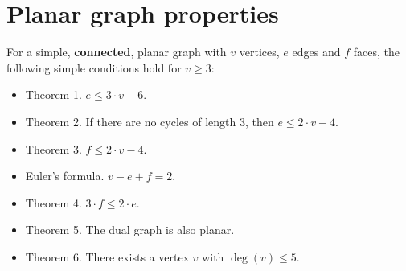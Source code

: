 \section*{Planar graph properties}

For a simple, \textbf{connected}, planar graph with $v$ vertices, $e$ edges and $f$ faces, the following simple conditions hold for $v \ge 3$:
\begin{itemize}
\item Theorem 1. $e \le 3 \cdot v - 6$.
\item Theorem 2. If there are no cycles of length 3, then $e \le 2 \cdot v - 4$.
\item Theorem 3. $f \le 2 \cdot v - 4$.
\item Euler's formula. $v - e + f = 2$.
\item Theorem 4. $3 \cdot f \le 2 \cdot e$.
\item Theorem 5. The dual graph is also planar.
\item Theorem 6. There exists a vertex $v$ with $\deg(v) \le 5$.
\end{itemize}
